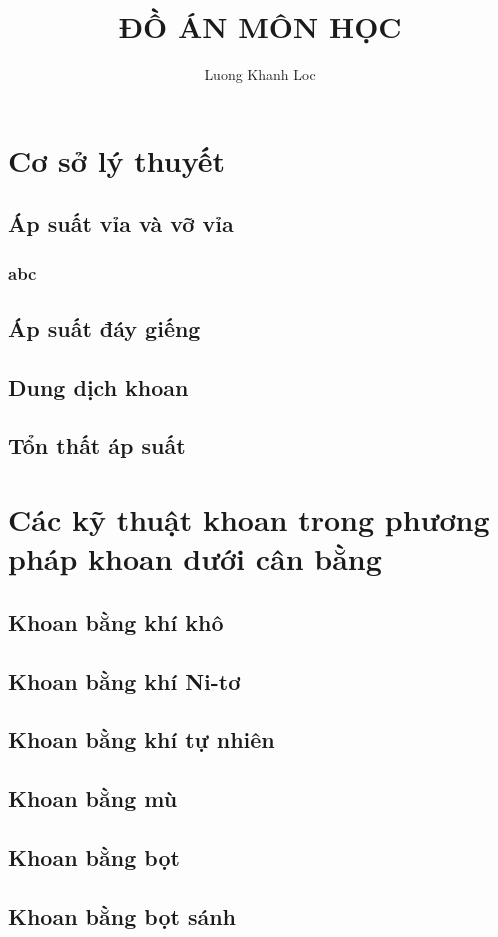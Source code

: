\documentclass[13pt,a4paper]{article}
\title{\textbf{ĐỒ ÁN MÔN HỌC}}
\author{Luong Khanh Loc}
\begin{document}
\maketitle
\section{Cơ sở lý thuyết}
\subsection{Áp suất vỉa và vỡ vỉa}
\subsubsection{abc}

\subsection{Áp suất đáy giếng}
\subsection{Dung dịch khoan}
\subsection{Tổn thất áp suất}
\section{Các kỹ thuật khoan trong phương pháp khoan dưới cân bằng}
\subsection{Khoan bằng khí khô}
\subsection{Khoan bằng khí Ni-tơ}
\subsection{Khoan bằng khí tự nhiên}
\subsection{Khoan bằng mù}
\subsection{Khoan bằng bọt}
\subsection{Khoan bằng bọt sánh}
\end{document}
